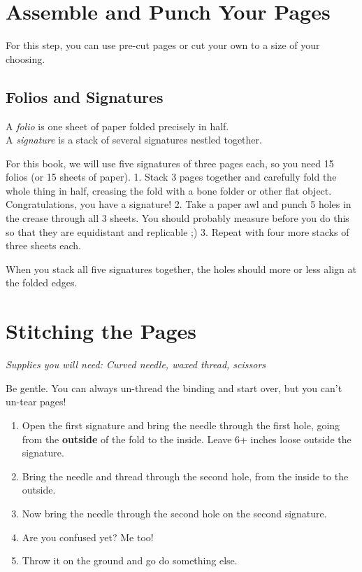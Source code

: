 \documentclass[
  openany]{book}
\providecommand{\tightlist}{%
  \setlength{\itemsep}{0pt}\setlength{\parskip}{0pt}}
\begin{document}
\chapter{Assemble and Punch Your Pages}\label{assemble-and-punch-your-pages}

For this step, you can use pre-cut pages or cut your own to a size of your choosing.

\section{Folios and Signatures}\label{folios-and-signatures}

A \emph{folio} is one sheet of paper folded precisely in half.\\
A \emph{signature} is a stack of several signatures nestled together.

For this book, we will use five signatures of three pages each, so you need 15 folios (or 15 sheets of paper).
1. Stack 3 pages together and carefully fold the whole thing in half, creasing the fold with a bone folder or other flat object. Congratulations, you have a signature!
2. Take a paper awl and punch 5 holes in the crease through all 3 sheets. You should probably measure before you do this so that they are equidistant and replicable ;)
3. Repeat with four more stacks of three sheets each.

When you stack all five signatures together, the holes should more or less align at the folded edges.

\chapter{Stitching the Pages}\label{stitching-the-pages}

\emph{Supplies you will need: Curved needle, waxed thread, scissors}

Be gentle. You can always un-thread the binding and start over, but you can't un-tear pages!

\begin{enumerate}
\def\labelenumi{\arabic{enumi}.}
\tightlist
\item
  Open the first signature and bring the needle through the first hole, going from the \textbf{outside} of the fold to the inside. Leave 6+ inches loose outside the signature.
\item
  Bring the needle and thread through the second hole, from the inside to the outside.
\item
  Now bring the needle through the second hole on the second signature.
\item
  Are you confused yet? Me too!
\item
  Throw it on the ground and go do something else.
\end{enumerate}
\end{document}
